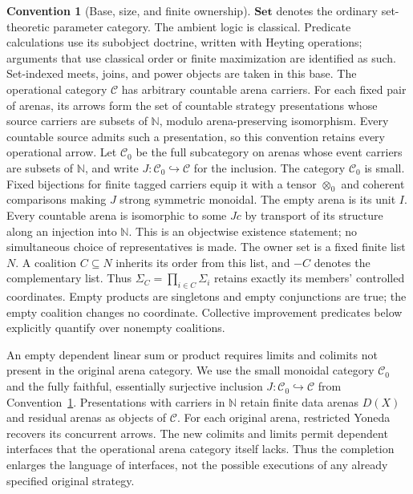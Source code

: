 \documentclass[11pt,a4paper]{article}
\numberwithin{equation}{section}
\theoremstyle{definition}
\newtheorem{convention}[theorem]{Convention}
\theoremstyle{remark}
\theoremstyle{plain}
\begin{document}
\begin{convention}[Base, size, and finite ownership]
\label{conv:egt-base}
$\mathbf{Set}$ denotes the ordinary set-theoretic parameter category.
The ambient logic is classical. Predicate calculations use its subobject
doctrine, written with Heyting operations; arguments that use classical order
or finite maximization are identified as such. Set-indexed meets, joins, and
power objects are taken in this base.  The operational category $\mathcal C$ has arbitrary countable
arena carriers. For each fixed pair of arenas, its arrows form the set of
countable strategy presentations whose source carriers are subsets of
$\mathbb N$, modulo arena-preserving isomorphism. Every countable source
admits such a presentation, so this convention retains every operational
arrow. Let $\mathcal C_0$ be the full subcategory on arenas whose event
carriers are subsets of $\mathbb N$, and write
$J:\mathcal C_0\hookrightarrow\mathcal C$ for the inclusion.
The category $\mathcal C_0$ is small. Fixed bijections for finite tagged
carriers equip it with a tensor $\otimes_0$ and coherent comparisons
making $J$ strong symmetric monoidal. The empty arena is its unit $I$.
Every countable arena is isomorphic to some $Jc$ by transport of its
structure along an injection into $\mathbb N$. This is an objectwise
existence statement; no simultaneous choice of representatives is made.
The owner set is a fixed finite list $N$. A coalition $C\subseteq N$
inherits its order from this list, and $-C$ denotes the complementary list.
Thus $\Sigma_C=\prod_{i\in C}\Sigma_i$ retains exactly its members'
controlled coordinates. Empty products are singletons and empty conjunctions
are true; the empty coalition changes no coordinate. Collective improvement
predicates below explicitly quantify over nonempty coalitions.
\end{convention}

An empty dependent linear sum or product requires limits and colimits
not present in the original arena category. We use the small monoidal
category $\mathcal C_0$ and the fully faithful, essentially surjective
inclusion $J:\mathcal C_0\hookrightarrow\mathcal C$ from
Convention~\ref{conv:egt-base}. Presentations with carriers in
$\mathbb N$ retain finite data arenas $D(X)$ and residual arenas
as objects of $\mathcal C$. For each original arena, restricted
Yoneda recovers its concurrent arrows. The new colimits and limits permit
dependent interfaces that the operational arena category itself lacks.
Thus the completion enlarges the language of interfaces, not the possible
executions of any already specified original strategy.
\end{document}
